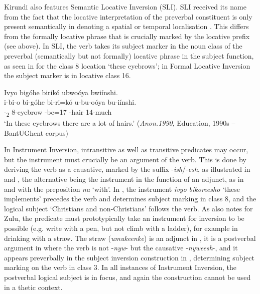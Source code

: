 \documentclass[output=paper]{langscibook}
\begin{document}
\z

Kirundi also features Semantic Locative Inversion (SLI). SLI received its name from the fact that the locative interpretation of the preverbal constituent is only present semantically in denoting a spatial or temporal localisation \citep{Buell2007}. This differs from the formally locative phrase that is crucially marked by the locative prefix (see above). In SLI, the verb takes its subject marker in the noun class of the preverbal (semantically but not formally) locative phrase in the subject function, as seen in  for the class 8 location `these eyebrows'; in Formal Locative Inversion the subject marker is in locative class 16.\largerpage[2]

\ea
\label{bkm:Ref149303804}
Ivyo bigóhe birikó ubwoóya bwiínshi.\\
\gll
i-bi-o  bi-góhe  bi-ri=kó  u-bu-oóya  bu-iínshi.\\
-\DEM{}\textsubscript{2}  8-eyebrow  -{}be=17  -hair  14-much\\
\glt
‘In these eyebrows there are a lot of hairs.’ (\textit{Anon.1990}, Education, 1990s – BantUGhent corpus)\\

\z

In Instrument Inversion, intransitive as well as transitive predicates may occur, but the instrument must crucially be an argument of the verb. This is done by deriving the verb as a causative, marked by the suffix -\textit{ish}/-\textit{esh}, as illustrated in  and , the alternative being the instrument in the function of an adjunct, as in  and  with the preposition \textit{na} ‘with’. In , the instrument \textit{ivyo bikoreesho} ‘these implements’ precedes the verb and determines subject marking in class 8, and the logical subject ‘Christians and non-Christians’ follows the verb. As \citet{Zeller2013} also notes for Zulu, the predicate must prototypically take an instrument for inversion to be possible (e.g. write with a pen, but not climb with a ladder), for example in  drinking with a straw. The straw (\textit{umukeenke}) is an adjunct in , it is a postverbal argument in  where the verb is not -\textit{nyw}- but the causative -\textit{nyweesh}-, and it appears preverbally in the subject inversion construction in , determining subject marking on the verb in class 3. In all instances of Instrument Inversion, the postverbal logical subject is in focus, and again the construction cannot be used in a thetic context.
\end{document}
